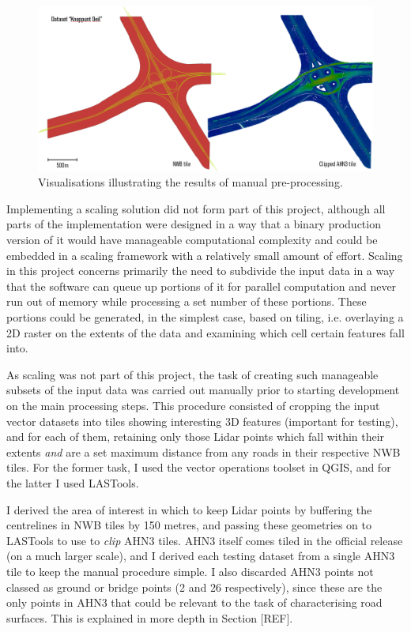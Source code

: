 \begin{figure}
    \centering
    \includegraphics[width=0.9\linewidth]{final_report/figs/manualpreprocessing.png}
    \caption{Visualisations illustrating the results of manual pre-processing.}
    \label{fig:manualpreprocessing}
\end{figure}

Implementing a scaling solution did not form part of this project, although all parts of the implementation were designed in a way that a binary production version of it would have manageable computational complexity and could be embedded in a scaling framework with a relatively small amount of effort. Scaling in this project concerns primarily the need to subdivide the input data in a way that the software can queue up portions of it for parallel computation and never run out of memory while processing a set number of these portions. These portions could be generated, in the simplest case, based on tiling, i.e. overlaying a 2D raster on the extents of the data and examining which cell certain features fall into.

As scaling was not part of this project, the task of creating such manageable subsets of the input data was carried out manually prior to starting development on the main processing steps. This procedure consisted of cropping the input vector datasets into tiles showing interesting 3D features (important for testing), and for each of them, retaining only those Lidar points which fall within their extents \textit{and} are a set maximum distance from any roads in their respective NWB tiles. For the former task, I used the vector operations toolset in QGIS, and for the latter I used LASTools.

I derived the area of interest in which to keep Lidar points by buffering the centrelines in NWB tiles by 150 metres, and passing these geometries on to LASTools to use to \textit{clip} AHN3 tiles. AHN3 itself comes tiled in the official release (on a much larger scale), and I derived each testing dataset from a single AHN3 tile to keep the manual procedure simple. I also discarded AHN3 points not classed as ground or bridge points (2 and 26 respectively), since these are the only points in AHN3 that could be relevant to the task of characterising road surfaces. This is explained in more depth in Section [REF]. 


